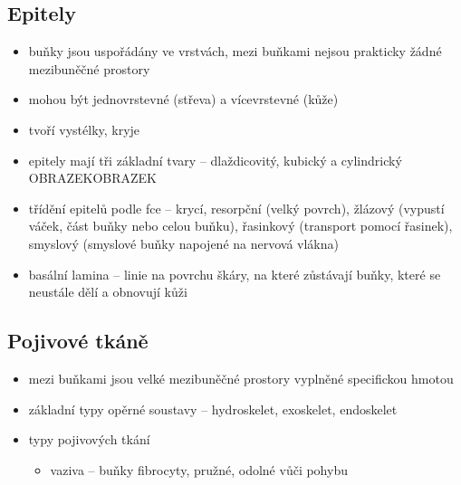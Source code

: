 \documentclass{article}
\begin{document}
\subsection{Epitely}
\begin{itemize}
  \item buňky jsou uspořádány ve vrstvách, mezi buňkami nejsou prakticky žádné mezibuněčné prostory
  \item mohou být jednovrstevné (střeva) a vícevrstevné (kůže)
  \item tvoří vystélky, kryje
  \item epitely mají tři základní tvary -- dlaždicovitý, kubický a cylindrický OBRAZEKOBRAZEK
  \item třídění epitelů podle fce -- krycí, resorpční (velký povrch), žlázový (vypustí váček, část buňky nebo celou buňku), řasinkový (transport pomocí řasinek), smyslový (smyslové buňky napojené na nervová vlákna)
  \item basální lamina -- linie na povrchu škáry, na které zůstávají buňky, které se neustále dělí a obnovují kůži
\end{itemize}

\subsection{Pojivové tkáně}
\begin{itemize}
  \item mezi buňkami jsou velké mezibuněčné prostory vyplněné specifickou hmotou
  \item základní typy opěrné soustavy -- hydroskelet, exoskelet, endoskelet
  \item typy pojivových tkání
  \begin{itemize}
    \item vaziva -- buňky fibrocyty, pružné, odolné vůči pohybu 
  \end{itemize}
\end{itemize}
\end{document}
